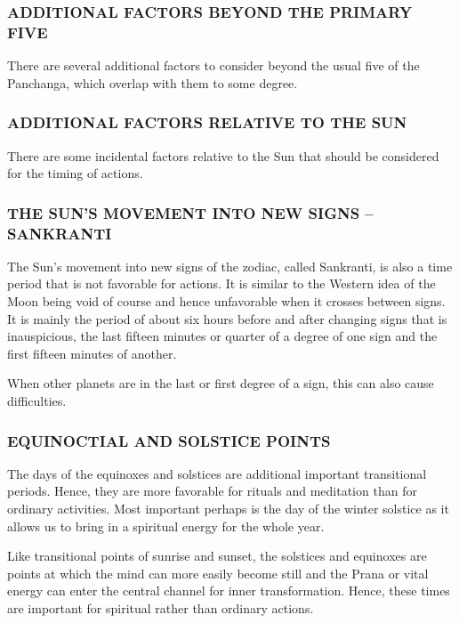 \begin{enumerate}
\begin{enumerate}
 
\subsubsection{ADDITIONAL FACTORS BEYOND THE PRIMARY FIVE}
 

There are several additional factors to consider beyond the usual five of the Panchanga, which overlap with them to some degree.

 

\subsubsection{ADDITIONAL FACTORS RELATIVE TO THE SUN}
 

There are some incidental factors relative to the Sun that should be considered for the timing of actions.

 

\subsubsection{THE SUN’S MOVEMENT INTO NEW SIGNS – SANKRANTI}

The Sun’s movement into new signs of the zodiac, called Sankranti, is also a time period that is not favorable for actions. It is similar to the Western idea of the Moon being void of course and hence unfavorable when it crosses between signs. It is mainly the period of about six hours before and after changing signs that is inauspicious, the last fifteen minutes or quarter of a degree of one sign and the first fifteen minutes of another.

 

When other planets are in the last or first degree of a sign, this can also cause difficulties.

 

\subsubsection{EQUINOCTIAL AND SOLSTICE POINTS}

The days of the equinoxes and solstices are additional important transitional periods. Hence, they are more favorable for rituals and meditation than for ordinary activities. Most important perhaps is the day of the winter solstice as it allows us to bring in a spiritual energy for the whole year.

 

Like transitional points of sunrise and sunset, the solstices and equinoxes are points at which the mind can more easily become still and the Prana or vital energy can enter the central channel for inner transformation. Hence, these times are important for spiritual rather than ordinary actions.


\end{enumerate}
\end{enumerate}

